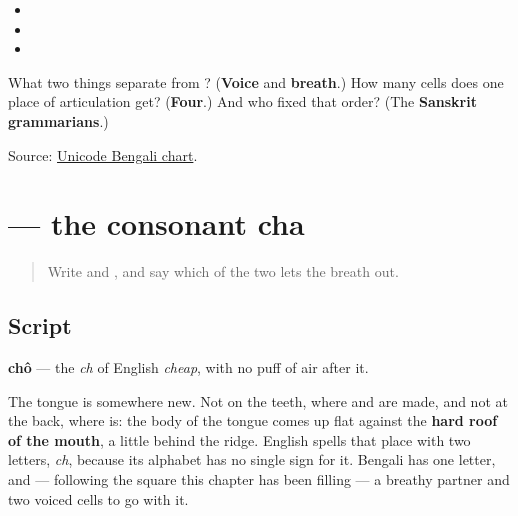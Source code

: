 \begin{itemize}
\raggedright
  \item {}
  \item {}  
  \item {} 
\end{itemize}

\begin{tcolorbox}[breakable,colback=teal!4,colframe=teal!35!black,title={Before you move on}]
What two things separate \textbf{} from \textbf{}? (\textbf{Voice} and \textbf{breath}.) How many cells does one place of articulation get? (\textbf{Four}.) And who fixed that order? (The \textbf{Sanskrit grammarians}.)

Source: \href{https://www.unicode.org/charts/PDF/U0980.pdf}{Unicode Bengali chart}.
\end{tcolorbox}
\section[\texorpdfstring{\bn{চ} (chô)}{চ (chô)}]{ — the consonant cha}

\label{lesson:BN-W04-cha}



\begin{quote}
Write \textbf{} and \textbf{}, and say which of the two lets the breath out.
\end{quote}

\subsection*{Script}

\begin{quote}
\end{quote}

\textbf{chô} — the \emph{ch} of English \emph{cheap}, with no puff of air after it.

The tongue is somewhere new. Not on the teeth, where \textbf{} and \textbf{} are made, and not at the back, where \textbf{} is: the body of the tongue comes up flat against the \textbf{hard roof of the mouth}, a little behind the ridge. English spells that place with two letters, \emph{ch}, because its alphabet has no single sign for it. Bengali has one letter, and — following the square this chapter has been filling — a breathy partner and two voiced cells to go with it.

